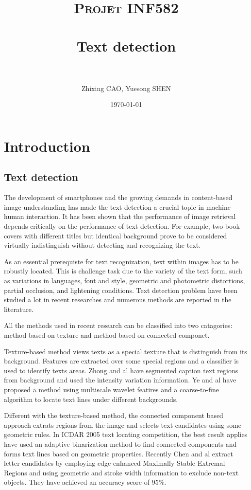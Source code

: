 \documentclass[paper=a4, french, 11pt]{scrartcl}
\title{	
\normalfont \normalsize 
\textsc{Projet INF582} \\ [25pt] 
\horrule{0.5pt} \\[0.5cm] %
\huge Text detection \\ %
\horrule{2pt} \\[0.5cm] %
}
\author{Zhixing CAO, Yuesong SHEN} %
\date{\normalsize\today} %
\begin{document}
\setlength\parindent{12pt}
\maketitle %

\section{Introduction}
\subsection{Text detection}
The development of smartphones and the growing demands in content-based image understanding has made the text detection a crucial topic in machine-human interaction. It has been shown that the performance of image retrieval depends critically on the performance of text detection. For example, two book covers with different titles but identical background prove to be considered virtually indistinguish without detecting and recognizing the text.  

As an essential prerequiste for text recognization, text within images has to be robustly located. This is challenge task due to the variety of the text form, such as variations in languages, font and style, geometric and photometric distortions, partial occlusion, and lightening conditions. Text detection problem have been studied a lot in recent researches and numerous methods are reported in the literature.

All the methods used in recent research can be classified into two catagories: method based on texture and method based on connected componet.

Texture-based method views texts as a special texture that is distinguish from its background. Features are extracted over some special regions and a classifier is used to identify texts areas. Zhong and al have segmented caption text regions from background and used the intensity variation information. Ye and al have proposed a method using multiscale wavelet featires and a coarse-to-fine algorithm to locate text lines under different backgrounds.

Different with the texture-based method, the connected component based approach extrats regions from the image and selects text candidates using some geometric rules. In ICDAR 2005 text locating competition, the best result applies have used an adaptive binarization method to find connected components and forms text lines based on geometric properties. Recently Chen and al extract letter candidates by employing edge-enhanced Maximally Stable Extremal Regions and using geometric and stroke width information to exclude non-text objects. They have achieved an accuracy score of 95\%.
\end{document}
